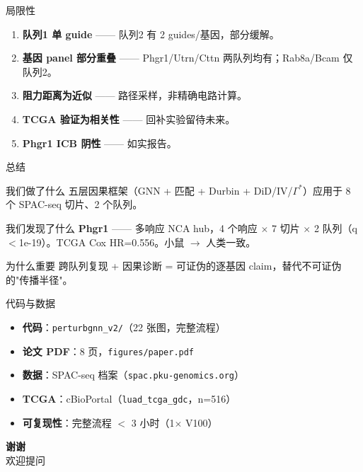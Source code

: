 \documentclass[aspectratio=169]{beamer}
\begin{document}
\begin{frame}{局限性}
\begin{enumerate}
\item \textbf{队列1 单 guide} —— 队列2 有 2 guides/基因，部分缓解。
\item \textbf{基因 panel 部分重叠} —— Phgr1/Utrn/Cttn 两队列均有；Rab8a/Bcam 仅队列2。
\item \textbf{阻力距离为近似} —— 路径采样，非精确电路计算。
\item \textbf{TCGA 验证为相关性} —— 回补实验留待未来。
\item \textbf{Phgr1 ICB 阴性} —— 如实报告。
\end{enumerate}
\end{frame}

\begin{frame}{总结}
\begin{block}{我们做了什么}
五层因果框架（GNN + 匹配 + Durbin + DiD/IV/$\Gamma^*$）应用于 8 个 SPAC-seq 切片、2 个队列。
\end{block}

\begin{block}{我们发现了什么}
\textbf{Phgr1} —— 多响应 NCA hub，4 个响应 $\times$ 7 切片 $\times$ 2 队列（q$<$1e-19）。TCGA Cox HR=0.556。小鼠 $\to$ 人类一致。
\end{block}

\begin{block}{为什么重要}
跨队列复现 + 因果诊断 = 可证伪的逐基因 claim，替代不可证伪的"传播半径"。
\end{block}
\end{frame}

\begin{frame}{代码与数据}
\begin{itemize}
\item \textbf{代码}：\texttt{perturbgnn\_v2/}（22 张图，完整流程）
\item \textbf{论文 PDF}：8 页，\texttt{figures/paper.pdf}
\item \textbf{数据}：SPAC-seq 档案（\texttt{spac.pku-genomics.org}）
\item \textbf{TCGA}：cBioPortal（\texttt{luad\_tcga\_gdc}，n=516）
\item \textbf{可复现性}：完整流程 $<$ 3 小时（1$\times$ V100）
\end{itemize}

\vspace{0.5cm}
\begin{center}
\Large \textbf{谢谢} \\[0.3cm]
\normalsize 欢迎提问
\end{center}
\end{frame}
\end{document}
